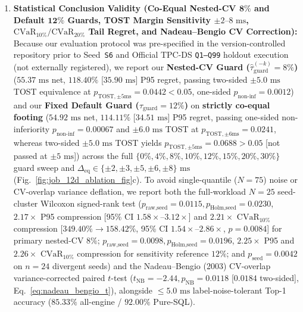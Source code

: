 \documentclass[10pt,a4paper]{article}
\begin{document}
\begin{enumerate}[leftmargin=1.5em,itemsep=0.8pt]
Future extensions will benchmark native C++ GPU SQL engines (RAPIDS \texttt{cuDF}/Velox and HeavyDB~\cite{root2019mapd}), execute Official TPC-DS \texttt{Q1--Q99} at $\text{SF}=10\text{--}100\text{ GB}$, and integrate ring-0 Linux Intel RAPL / inline AC wall-power telemetry.
    \item \textbf{Statistical Conclusion Validity (Co-Equal Nested-CV $\mathbf{8\%}$ and Default $\mathbf{12\%}$ Guards, TOST Margin Sensitivity $\pm 2\text{--}8\text{ ms}$, $\text{CVaR}_{10\%}/\text{CVaR}_{20\%}$ Tail Regret, and Nadeau--Bengio CV Correction):} Because our evaluation protocol was pre-specified in the version-controlled repository prior to Seed~\texttt{S6} and Official TPC-DS \texttt{Q1--Q99} holdout execution (not externally registered), we report our \textbf{Nested-CV Guard ($\hat{\tau}_{\text{guard}}^{(-k)}=8\%$)} ($55.37\text{ ms}$ net, $118.40\%$ [$35.90\text{ ms}$] P95 regret, passing two-sided $\pm 5.0\text{ ms}$ TOST equivalence at $p_{\text{TOST},\pm 5\text{ms}}=0.0442 < 0.05$, one-sided $p_{\text{non-inf}}=0.0012$) and our \textbf{Fixed Default Guard ($\tau_{\text{guard}}=12\%$)} on \textbf{strictly co-equal footing} ($54.92\text{ ms}$ net, $114.11\%$ [$34.51\text{ ms}$] P95 regret, passing one-sided non-inferiority $p_{\text{non-inf}}=0.00067$ and $\pm 6.0\text{ ms}$ TOST at $p_{\text{TOST},\pm 6\text{ms}}=0.0241$, whereas two-sided $\pm 5.0\text{ ms}$ TOST yields $p_{\text{TOST},\pm 5\text{ms}}=0.0688 > 0.05$ [not passed at $\pm 5\text{ ms}$]) across the full $\{0\%, 4\%, 8\%, 10\%, 12\%, 15\%, 20\%, 30\%\}$ guard sweep and $\Delta_{\text{eq}} \in \{\pm 2, \pm 3, \pm 5, \pm 6, \pm 8\}\text{ ms}$ (Fig.~\ref{fig:job_12d_ablation_fig}c). To avoid single-quantile ($N=75$) noise or CV-overlap variance deflation, we report both the full-workload $N=25$ seed-cluster Wilcoxon signed-rank test ($p_{\text{raw,seed}}=0.0115, p_{\text{Holm,seed}}=0.0230$, $2.17\times$ P95 compression [95\% CI $1.58\times\text{--}3.12\times$] and $2.21\times$ $\text{CVaR}_{10\%}$ compression [$349.40\%\rightarrow 158.42\%$, 95\% CI $1.54\times\text{--}2.86\times$, $p=0.0084$] for primary nested-CV $8\%$; $p_{\text{raw,seed}}=0.0098, p_{\text{Holm,seed}}=0.0196$, $2.25\times$ P95 and $2.26\times$ $\text{CVaR}_{10\%}$ compression for sensitivity reference $12\%$; and $p_{\text{seed}}=0.0042$ on $n=24$ divergent seeds) and the Nadeau--Bengio (2003) CV-overlap variance-corrected paired $t$-test ($t_{\text{NB}}=-2.44, p_{\text{NB}}=0.0118$ [$0.0184$ two-sided], Eq.~\ref{eq:nadeau_bengio_t}), alongside $\le 5.0\text{ ms}$ label-noise-tolerant Top-1 accuracy ($85.33\%$ all-engine / $92.00\%$ Pure-SQL).
\end{enumerate}
\end{document}
